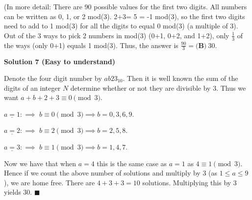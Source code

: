 \begin{enumerate}
 (In more detail: There are 90 possible values for the first two digits. All numbers can be written as 0, 1, or 2 mod(3). 2+3= 5 = -1 mod(3), so the first two digits need to add to 1 mod(3) for all the digits to equal 0 mod(3) (a multiple of 3). Out of the 3 ways to pick 2 numbers in mod(3) (0+1, 0+2, and 1+2), only $\frac{1}{3}$ of the ways (only 0+1) equals 1 mod(3). Thus, the answer is $\frac{90}{3} = \boxed{\textbf{(B)}\ 30}$.

 



\textbf{Solution 7 (Easy to understand)}

Denote the four digit number by $ab23_{10}$. Then it is well known the sum of the digits of an integer $N$ determine whether or not they are divisible by $3$. Thus we want $a + b + 2 + 3 \equiv 0 \pmod 3$.

 $\underline{a = 1}: \implies$ $b \equiv 0 \pmod 3 \implies b = 0, 3, 6, 9$.

 $\underline{a = 2}: \implies$ $b \equiv 2 \pmod 3 \implies b = 2, 5, 8$.

 $\underline{a = 3}: \implies$ $b \equiv 1 \pmod 3 \implies b = 1, 4, 7$.

 
Now we have that when $a = 4$ this is the same case as $a = 1$ as $4 \equiv 1 \pmod 3$. Hence if we count the above number of solutions and multiply by $3$ (as $1 \leq a \leq 9$), we are home free. There are $4 + 3 + 3 = 10$ solutions. Multiplying this by $3$ yields $\boxed{30}$. $\blacksquare$



\end{enumerate}